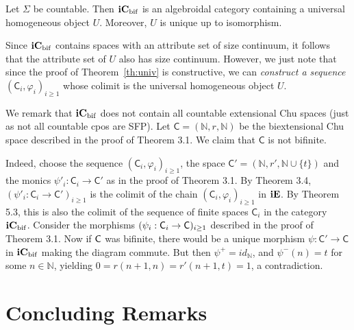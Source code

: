 \documentclass{LMCS}
\begin{document}
\begin{thm}\label{thm:iCbifalgebroidal}
  Let $\Sigma$ be countable. Then ${\bf iC}_{\rm bif}$ is an
  algebroidal category containing a universal homogeneous object $U$. 
  Moreover, $U$ is unique up to isomorphism. 
\end{thm}

  Since ${\bf iC}_{\rm bif}$ contains spaces with an attribute set of
  size continuum, it follows that the attribute set of $U$ also has
  size continuum. However, we just note that since the proof of
  Theorem~\ref{th:univ} is constructive, we can
  \emph{construct a sequence} $(\mathsf{C}_i,\varphi_i)_{i \geq 1}$ whose
  colimit is the universal homogeneous object $U$. 



We remark that ${\bf iC}_{\rm bif}$ does not contain all countable extensional Chu spaces
(just as not all countable cpos are SFP). 
Let  $\mathsf{C} = (\mathbb{N},r,\mathbb{N})$
be the biextensional Chu space
described in the proof of Theorem 3.1. We claim that
$\mathsf{C}$  is not bifinite. 

Indeed, choose the sequence $(\mathsf{C}_i,\varphi_i)_{i \geq 1}$, the
space $\mathsf{C}' = (\mathbb{N},r',\mathbb{N} \cup \{t\})$ and the
monics $\psi'_i: \mathsf{C}_i \to \mathsf{C}'$ as in the proof of Theorem
3.1.  By Theorem 3.4, $(\psi'_i:\mathsf{C}_i \to \mathsf{C}')_{i \geq
  1}$ is the colimit of the chain $(\mathsf{C}_i,\varphi_i)_{i \geq 1}$
in ${\bf iE}$.  By Theorem 5.3, this is also the colimit of the
sequence of finite spaces $\mathsf{C}_i$ in the category ${\bf iC}_{\rm
  bif}$.  Consider the morphisms $(\psi_i: \mathsf{C}_i \to {\sf
  C})_{i\geq 1}$ described in the proof of Theorem 3.1.  Now if ${\sf
  C}$ was bifinite, there would be a unique morphism $\psi: \mathsf{C}'
\to \mathsf{C}$ in ${\bf iC}_{\rm bif}$ making the diagram commute. But
then $\psi^+ = id_{\mathbb{N}}$, and $\psi^-(n) = t$ for some $n \in
\mathbb{N}$, yielding $0 = r(n+1,n) = r'(n+1,t) = 1$, a contradiction. 

\section{Concluding Remarks}
\end{document}
